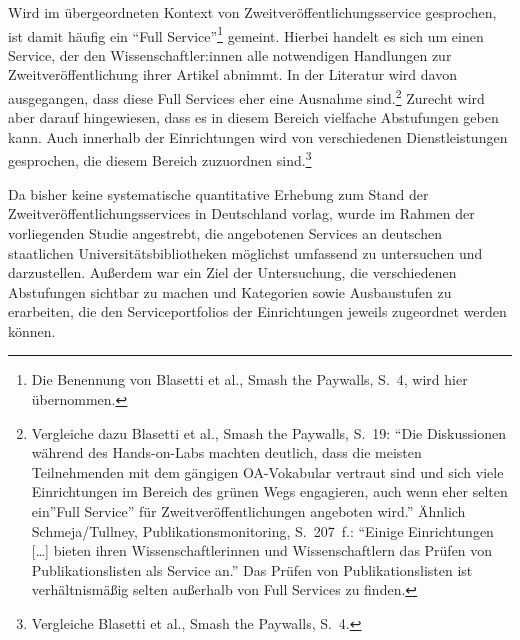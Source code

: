 \documentclass[a4paper,
fontsize=11pt,
oneside,
numbers=noperiodatend,
parskip=half-,
bibliography=totoc,
final
]{scrartcl}
\begin{document}
Wird im übergeordneten Kontext von Zweitveröffentlichungsservice
gesprochen, ist damit häufig ein \enquote{Full Service}\footnote{Die
  Benennung von Blasetti et al., Smash the Paywalls, S.~4, wird hier
  übernommen.} gemeint. Hierbei handelt es sich um einen Service, der
den Wissenschaftler:innen alle notwendigen Handlungen zur
Zweitveröffentlichung ihrer Artikel abnimmt. In der Literatur wird davon
ausgegangen, dass diese Full Services eher eine Ausnahme
sind.\footnote{Vergleiche dazu Blasetti et al., Smash the Paywalls,
  S.~19: \enquote{Die Diskussionen während des Hands-on-Labs machten
  deutlich, dass die meisten Teilnehmenden mit dem gängigen OA-Vokabular
  vertraut sind und sich viele Einrichtungen im Bereich des grünen Wegs
  engagieren, auch wenn eher selten ein}Full Service'' für
  Zweitveröffentlichungen angeboten wird.'' Ähnlich Schmeja/Tullney,
  Publikationsmonitoring, S.~207~f.: \enquote{Einige Einrichtungen
  {[}\ldots{]} bieten ihren Wissenschaftlerinnen und Wissenschaftlern
  das Prüfen von Publikationslisten als Service an.} Das Prüfen von
  Publikationslisten ist verhältnismäßig selten außerhalb von Full
  Services zu finden.} Zurecht wird aber darauf hingewiesen, dass es in
diesem Bereich vielfache Abstufungen geben kann. Auch innerhalb der
Einrichtungen wird von verschiedenen Dienstleistungen gesprochen, die
diesem Bereich zuzuordnen sind.\footnote{Vergleiche Blasetti et al.,
  Smash the Paywalls, S.~4.}

Da bisher keine systematische quantitative Erhebung zum Stand der
Zweitveröffentlichungsservices in Deutschland vorlag, wurde im Rahmen
der vorliegenden Studie angestrebt, die angebotenen Services an
deutschen staatlichen Universitätsbibliotheken möglichst umfassend zu
untersuchen und darzustellen. Außerdem war ein Ziel der Untersuchung,
die verschiedenen Abstufungen sichtbar zu machen und Kategorien sowie
Ausbaustufen zu erarbeiten, die den Serviceportfolios der Einrichtungen
jeweils zugeordnet werden können.
\end{document}
